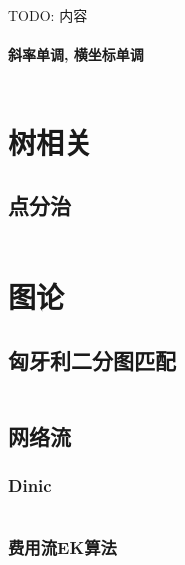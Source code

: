 \documentclass[utf8]{ctexart}
\newcommand{\cpp}[1]{\inputminted[linenos,breaklines,tabsize=4,mathescape]{c++}{#1}}
\begin{document}
TODO: 内容

\paragraph*{斜率单调, 横坐标单调}
\cpp{codes/dp/slope.cpp}


\section{树相关}

\subsection{点分治}
\cpp{codes/tree/centroid-decomposition.cpp}



\section{图论}

\subsection[匈牙利]{匈牙利二分图匹配}
\cpp{codes/graph/hungarian.cpp}

\subsection{网络流}

\subsubsection{Dinic}
\cpp{codes/graph/network-flows/dinic.cpp}

\subsubsection[费用流]{费用流EK算法}
\cpp{codes/graph/network-flows/ek-mcmf.cpp}
\end{document}
